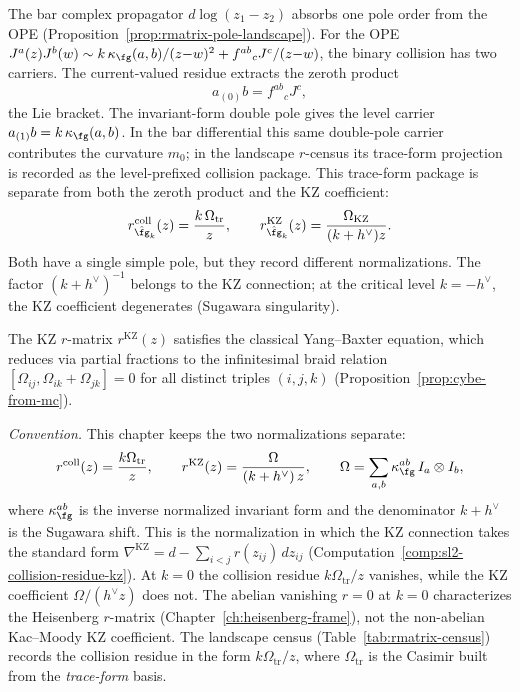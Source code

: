 \begin{remark}
\label{rem:km-collision-residue-rmatrix}
The bar complex propagator $d\log(z_1 - z_2)$ absorbs one pole
order from the OPE (Proposition~\ref{prop:rmatrix-pole-landscape}).
For the OPE
$J^a(z)J^b(w) \sim k\,\kappa_{\fg}(a,b)/(z{-}w)^2 + f^{ab}{}_{c}J^c/(z{-}w)$,
the binary collision has two carriers. The current-valued residue
extracts the zeroth product
\[
a_{(0)}b=f^{ab}{}_{c}J^c,
\]
the Lie bracket. The invariant-form double pole gives the level
carrier \(a_{(1)}b=k\,\kappa_{\fg}(a,b)\). In the bar differential
this same double-pole carrier contributes the curvature \(m_0\); in
the landscape \(r\)-census its trace-form projection is recorded as
the level-prefixed collision package. This trace-form package is
separate from both the zeroth product and the KZ coefficient:
\begin{equation}\label{eq:km-rmatrix}
r^{\mathrm{coll}}_{\hat\fg_k}(z) = \frac{k\,\Omega_{\mathrm{tr}}}{z},
\qquad
r^{\mathrm{KZ}}_{\hat\fg_k}(z)=\frac{\Omega_{\mathrm{KZ}}}{(k+h^\vee)z}.
\end{equation}
Both have a single simple pole, but they record different
normalizations. The factor $(k + h^\vee)^{-1}$ belongs to the KZ
connection; at the critical level $k = -h^\vee$, the KZ coefficient
degenerates (Sugawara singularity).

The KZ $r$-matrix $r^{\mathrm{KZ}}(z)$ satisfies the classical
Yang--Baxter equation, which reduces via partial fractions to
the infinitesimal braid relation
$[\Omega_{ij}, \Omega_{ik} + \Omega_{jk}] = 0$
for all distinct triples $(i,j,k)$
(Proposition~\ref{prop:cybe-from-mc}).

\emph{Convention.}
This chapter keeps the two normalizations separate:
\[
r^{\mathrm{coll}}(z)=\frac{k\Omega_{\mathrm{tr}}}{z},
\qquad
r^{\mathrm{KZ}}(z) = \frac{\Omega}{(k+h^\vee)\,z},
\qquad
\Omega = \sum_{a,b} \kappa_{\fg}^{ab}\, I_a \otimes I_b,
\]
where $\kappa_{\fg}^{ab}$ is the inverse normalized invariant form and the
denominator $k + h^\vee$ is the Sugawara shift. This is the
normalization in which the KZ connection takes the standard form
$\nabla^{\mathrm{KZ}} = d - \sum_{i < j} r(z_{ij})\, dz_{ij}$
(Computation~\ref{comp:sl2-collision-residue-kz}).
At $k = 0$ the collision residue $k\Omega_{\mathrm{tr}}/z$ vanishes,
while the KZ coefficient $\Omega/(h^\vee z)$ does not. The abelian
vanishing $r = 0$ at $k = 0$ characterizes the Heisenberg $r$-matrix
(Chapter~\ref{ch:heisenberg-frame}), not the non-abelian
Kac--Moody KZ coefficient.
The landscape census (Table~\ref{tab:rmatrix-census}) records the
collision residue in the form $k\Omega_{\mathrm{tr}}/z$, where
$\Omega_{\mathrm{tr}}$ is the Casimir built from the
\emph{trace-form} basis.
\end{remark}

